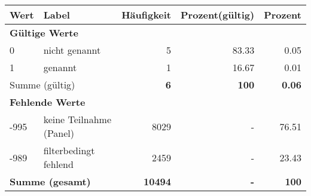      \begin{longtable}{lXrrr}
     \toprule
     \textbf{Wert} & \textbf{Label} & \textbf{Häufigkeit} & \textbf{Prozent(gültig)} & \textbf{Prozent} \\
     \endhead
     \midrule
     \multicolumn{5}{l}{\textbf{Gültige Werte}}\\

     0 &
     \multicolumn{1}{X}{ nicht genannt   } &


       \num{5} &
       \num[round-mode=places,round-precision=2]{83.33} &
         \num[round-mode=places,round-precision=2]{0.05} \\

     1 &
     \multicolumn{1}{X}{ genannt   } &


       \num{1} &
       \num[round-mode=places,round-precision=2]{16.67} &
         \num[round-mode=places,round-precision=2]{0.01} \\
     \midrule
     \multicolumn{2}{l}{Summe (gültig)} &
       \textbf{\num{6}} &
     \textbf{\num{100}} &
       \textbf{\num[round-mode=places,round-precision=2]{0.06}} \\
     \multicolumn{5}{l}{\textbf{Fehlende Werte}}\\
       -995 &
       keine Teilnahme (Panel) &
         \num{8029} &
        - &
         \num[round-mode=places,round-precision=2]{76.51} \\
       -989 &
       filterbedingt fehlend &
         \num{2459} &
        - &
         \num[round-mode=places,round-precision=2]{23.43} \\
     \midrule
     \multicolumn{2}{l}{\textbf{Summe (gesamt)}} &
          \textbf{\num{10494}} &
        \textbf{-} &
        \textbf{\num{100}} \\
     \bottomrule
     \end{longtable}
     
